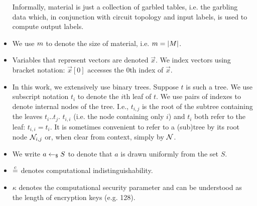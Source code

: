 \begin{itemize}
	Informally, material is just a collection of garbled tables, i.e. the garbling data which, in conjunction with circuit topology and input labels, is used to compute output labels.
\item We use $m$ to denote the size of material, i.e. $m =
  |M|$.
	\item Variables that represent vectors are denoted  
	 $\vec{x}$.
	We index vectors using bracket notation: $\vec{x}[0]$ accesses the $0$th index of $\vec{x}$.
\item In this work, we extensively use binary trees.
  Suppose $t$ is such a tree. We use subscript notation $t_i$ to denote the
  $i$th leaf of $t$.
  We use pairs of indexes to denote internal nodes of the tree.
  I.e., $t_{i, j}$ is the root of the subtree containing the leaves
  $t_i .. t_j$. $t_{i,i}$ (i.e. the node
  containing only $i$) and $t_i$ both refer to the leaf: $t_{i,i} =
  t_i$.
  It is sometimes convenient to refer to a (sub)tree by its root node
  $\mathtt{\cal N}_{i, j}$ or, when clear from context, simply by $\mathtt{\cal N}$.
	\item We write $a \gets_{\$} S$ to denote that $a$ is drawn
    uniformly from the set $S$.
	\item $\overset{c}{=}$ denotes computational indistinguishability.
	\item $\kappa$ denotes the computational security parameter and can be understood as the length of encryption keys (e.g. 128).
\end{itemize}

